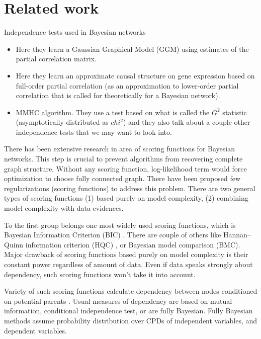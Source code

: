 \documentclass{article} %
\begin{document}
\section{Related work}
Independence tests used in Bayesian networks
\begin{itemize}
\item \cite{schafer2005empirical} Here they learn a Gaussian Graphical Model (GGM) using estimates of the partial correlation matrix. 
\item \cite{opgen2007correlation} Here they learn an approximate causal structure on gene expression based on full-order partial correlation (as an approximation to lower-order partial correlation that is called for theoretically for a Bayesian network).
\item \cite{tsamardinos2006max} MMHC algorithm.  They use a test based on what is called the $G^2$ statistic (asymptotically distributed as $chi^2$) and they also talk about a couple other independence tests that we may want to look into.
\end{itemize}

There has been extensive research in area of scoring functions for
Bayesian networks. This step is crucial to prevent algorithms from 
recovering complete graph structure.
Without any scoring function, log-likelihood term would force optimization
to choose fully connected graph. There have been proposed few regularizations (scoring functions)
to address this problem. There are two general types of scoring functions 
(1) based purely on model complexity, (2) combining model complexity with data evidences.



To the first group belongs 
one most widely used scoring functions, which 
is Bayesian Information Criterion (BIC) \cite{schwarz1978estimating}.
There are couple of others like Hannan–Quinn information criterion (HQC) \cite{hannan1979determination},
or Bayesian model comparison (BMC). Major drawback of scoring functions based
purely on model complexity is their constant power regardless of amount of data.
Even if data speaks strongly about dependency, such scoring functions won't take
it into account.




Variety of such scoring functions calculate dependency between nodes conditioned on
potential parents \cite{de2006scoring}. Usual measures of dependency are
based on mutual information, conditional independence test, or 
are fully Bayesian. Fully Bayesian methods assume probability 
distribution over CPDs of independent variables,
and dependent variables.
\end{document}
